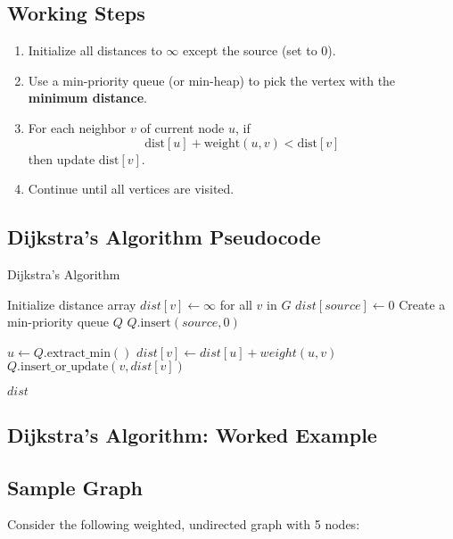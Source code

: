 \documentclass[14pt,a4paper]{extarticle}
\begin{document}
\subsection*{Working Steps}
\begin{enumerate}
    \item Initialize all distances to $\infty$ except the source (set to 0).
    \item Use a min-priority queue (or min-heap) to pick the vertex with the \textbf{minimum distance}.
    \item For each neighbor $v$ of current node $u$, if 
    \[
    \text{dist}[u] + \text{weight}(u, v) < \text{dist}[v]
    \]
    then update $\text{dist}[v]$.
    \item Continue until all vertices are visited.
\end{enumerate}

\subsection{Dijkstra’s Algorithm Pseudocode}
\begin{algorithm}[H]
\caption{Dijkstra’s Algorithm}
\begin{algorithmic}[1]
    \State Initialize distance array $dist[v] \gets \infty$ for all $v$ in $G$
    \State $dist[source] \gets 0$
    \State Create a min-priority queue $Q$
    \State $Q.\text{insert}(source, 0)$

        \State $u \gets Q.\text{extract\_min}()$
                \State $dist[v] \gets dist[u] + weight(u, v)$
                \State $Q.\text{insert\_or\_update}(v, dist[v])$
            \EndIf
        \EndFor
    \EndWhile

    \State \Return $dist$
\EndProcedure
\end{algorithmic}
\end{algorithm}

\newpage
\subsection{Dijkstra’s Algorithm: Worked Example}

\subsection*{Sample Graph}
Consider the following weighted, undirected graph with 5 nodes:
\end{document}
